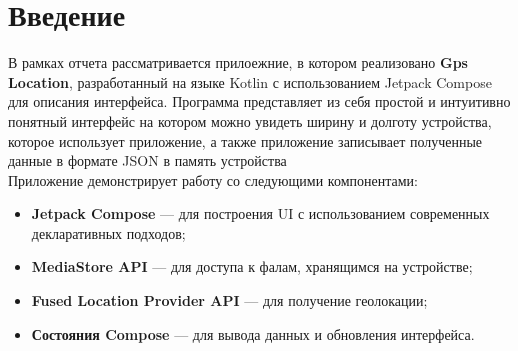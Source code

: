 \chapter*{Введение}
\label{ch:intro}
    В рамках отчета рассматривается прилоежние, в котором реализовано \textbf{Gps Location}, разработанный на языке Kotlin с использованием Jetpack Compose для описания интерфейса.
    Программа представляет из себя простой и интуитивно понятный интерфейс на котором можно увидеть ширину и долготу устройства, которое использует приложение, а также приложение записывает полученные данные в формате JSON в память устройства
    \\
    Приложение демонстрирует работу со следующими компонентами: 
    \\
    \begin{itemize}
        \item \textbf{Jetpack Compose} — для построения UI с использованием современных декларативных подходов;
        \item \textbf{MediaStore API} — для доступа к фалам, хранящимся на устройстве;
        \item \textbf{Fused Location Provider API} — для получение геолокации;
        \item \textbf{Состояния Compose} — для вывода данных и обновления интерфейса.
    \end{itemize}
\endinput